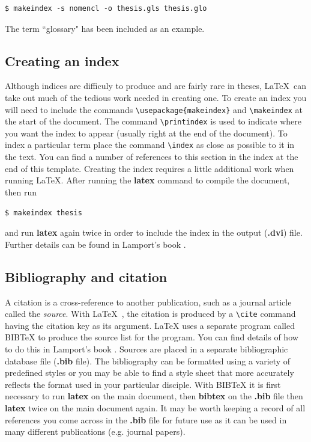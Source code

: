 \documentclass[11pt,oneside]{book}
\begin{document}
\begin{verbatim}
$ makeindex -s nomencl -o thesis.gls thesis.glo
\end{verbatim}

The term ``glossary" has been included as an example.

\subsection{Creating an index}
Although indices   are difficuly to produce and are
fairly rare in theses, \LaTeX \ can take
out much of
the tedious work needed in creating one. To create
an index you will need to include the commands \verb+\usepackage{makeindex}+
and \verb+\makeindex+ at the start of the document. The command \verb+\printindex+
is used to indicate where you want the index to appear (usually right at the
end of the document). To index a particular term place the command \verb+\index+
as close as possible to it in the text. You can find a number of references to
this section in the index at the end of this template. Creating the index
requires a little additional work when running \LaTeX. After running the
{\bf latex} command to compile the document, then run

\begin{verbatim}
$ makeindex thesis
\end{verbatim}

and run {\bf latex} again twice in order to include the index in the output
({\bf .dvi}) file. Further details can be found in Lamport's book \cite{latex}.


\subsection{Bibliography and citation}
A citation is a cross-reference to another publication, such as a journal
article called the {\em source}. With \LaTeX \ , the citation is produced 
by a \verb+\cite+ command having the citation key as its argument. \LaTeX
uses a separate program called BIBTeX to produce the source list for the
program. You can find details of how to do this in Lamport's book \cite{latex}.
Sources are placed in a separate bibliographic database file ({\bf .bib} file).
The bibliography can be formatted using a variety of predefined styles or you may
be able to find a style sheet that more accurately reflects the format
used in your particular disciple. With BIBTeX it is first necessary to
run {\bf latex} on the main document, then {\bf bibtex} on the {\bf .bib} file
then {\bf latex} twice on the main document again. It may be worth keeping a record
of all references you come across in the {\bf .bib} file for future use as it
can be used in many different publications (e.g. journal papers).
\end{document}
